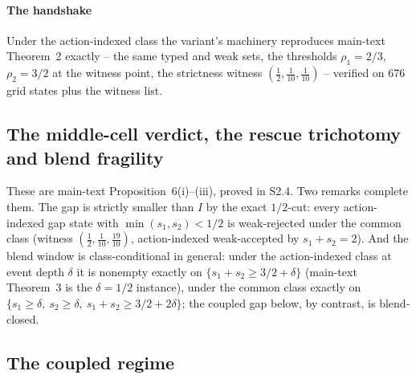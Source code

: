 \paragraph{The handshake} Under the action-indexed class the variant's machinery reproduces main-text Theorem~2 exactly -- the same typed and weak sets, the thresholds $\rho_1=2/3$, $\rho_2=3/2$ at the witness point, the strictness witness $(\tfrac12,\tfrac1{10},\tfrac1{10})$ -- verified on 676 grid states plus the witness list.

\subsection{The middle-cell verdict, the rescue trichotomy and blend fragility}

These are main-text Proposition~6(i)--(iii), proved in S2.4. Two remarks complete them. The gap is strictly smaller than $I$ by the exact $1/2$-cut: every action-indexed gap state with $\min(s_1,s_2)<1/2$ is weak-rejected under the common class (witness $(\tfrac12,\tfrac1{10},\tfrac{19}{10})$, action-indexed weak-accepted by $s_1+s_2=2$). And the blend window is class-conditional in general: under the action-indexed class at event depth $\delta$ it is nonempty exactly on $\{s_1+s_2\ge3/2+\delta\}$ (main-text Theorem~3 is the $\delta=1/2$ instance), under the common class exactly on $\{s_1\ge\delta,\ s_2\ge\delta,\ s_1+s_2\ge3/2+2\delta\}$; the coupled gap below, by contrast, is blend-closed.

\subsection{The coupled regime}

